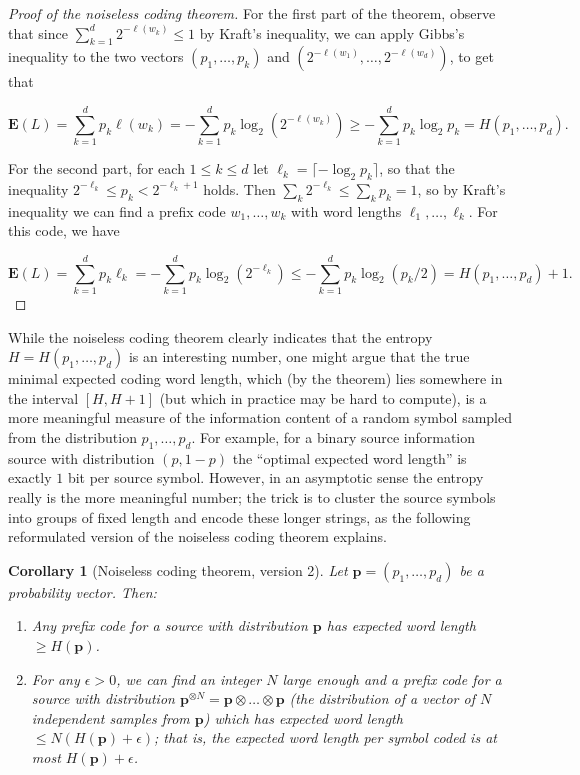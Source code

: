 \documentclass[11pt]{report}
\theoremstyle{plain}
\newtheorem{cor}[thm]{Corollary}
\theoremstyle{definition}
\begin{document}
\begin{proof}[Proof of the noiseless coding theorem]
For the first part of the theorem, observe that since
$\sum_{k=1}^d 2^{-\ell(w_k)}\le 1$ by Kraft's
inequality, we can apply Gibbs's inequality to the two
vectors $(p_1,\ldots,p_k)$ and
$(2^{-\ell(w_1)}, \ldots, 2^{-\ell(w_d)})$, to get
that

\[
\mathbf{E}(L) = \sum_{k=1}^d p_k \ell(w_k) = -\sum_{k=1}^d p_k \log_2 \left(2^{-\ell(w_k)}\right) \ge -\sum_{k=1}^d p_k \log_2 p_k = H(p_1,\ldots,p_d).
\]

\noindent For the second part, for each $1\le k\le d$ let
$\ell_k = \lceil -\log_2 p_k\rceil$, so that the
inequality $2^{-\ell_k} \le p_k < 2^{-\ell_k+1}$
holds. Then $\sum_k 2^{-\ell_k} \le \sum_k p_k = 1$,
so by Kraft's inequality we can find a prefix code
$w_1,\ldots,w_k$ with word lengths
$\ell_1,\ldots,\ell_k$. For this code, we have

\[
\mathbf{E}(L) = \sum_{k=1}^d p_k \ell_k = -\sum_{k=1}^d p_k \log_2\left(2^{-\ell_k}\right)
\le -\sum_{k=1}^d p_k \log_2 (p_k/2) = H(p_1,\ldots,p_d) + 1.
\]

\end{proof}

\noindent While the noiseless coding theorem clearly indicates
that the entropy $H=H(p_1,\ldots,p_d)$ is an
interesting number, one might argue that the true
minimal expected coding word length, which (by the
theorem) lies somewhere in the interval $[H,H+1]$
(but which in practice may be hard to compute), is a
more meaningful measure of the information content of
a random symbol sampled from the distribution
$p_1,\ldots,p_d$. For example, for a binary source
information source with distribution $(p,1-p)$ the
``optimal expected word length'' is exactly $1$ bit
per source symbol. However, in an asymptotic sense the
entropy really is the more meaningful number; the
trick is to cluster the source symbols into groups of
fixed length and encode these longer strings, as the
following reformulated version of the noiseless coding
theorem explains.

\begin{cor}[Noiseless coding theorem, version 2]
Let $\mathbf{p}=(p_1,\ldots,p_d)$ be a probability
vector. Then:

\begin{enumerate}[label=\arabic*.]
\item Any prefix code for a source with distribution
$\mathbf{p}$ has expected word length
$\ge H(\mathbf{p})$.

\item For any $\epsilon>0$, we can find an integer $N$
large enough and a prefix code for a source with
distribution
$\mathbf{p}^{\otimes
N}=\mathbf{p}\otimes\ldots\otimes\mathbf{p}$
(the distribution of a vector of $N$ independent
samples from $\mathbf{p}$) which has expected word
length $\le N(H(\mathbf{p})+\epsilon)$; that is, the
expected word length \emph{per symbol coded} is at most
$H(\mathbf{p})+\epsilon$.
\end{enumerate}

\end{cor}
\end{document}

